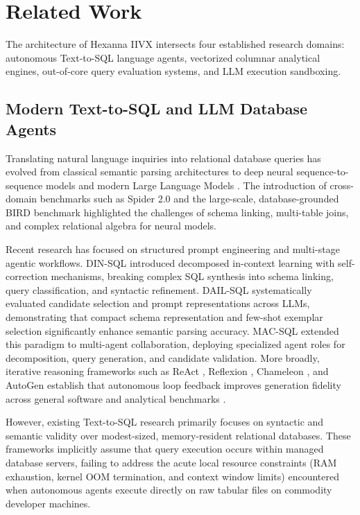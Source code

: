 \section{Related Work}
\label{sec:related_work}

The architecture of Hexanna IIVX intersects four established research domains: autonomous Text-to-SQL language agents, vectorized columnar analytical engines, out-of-core query evaluation systems, and LLM execution sandboxing.

\subsection{Modern Text-to-SQL and LLM Database Agents}
Translating natural language inquiries into relational database queries has evolved from classical semantic parsing architectures \cite{qin2024survey} to deep neural sequence-to-sequence models and modern Large Language Models \cite{zhou2022table,zan2023large,chen2021codex}. The introduction of cross-domain benchmarks such as Spider 2.0 \cite{zhang2024spider2} and the large-scale, database-grounded BIRD benchmark \cite{li2024bird} highlighted the challenges of schema linking, multi-table joins, and complex relational algebra for neural models.

Recent research has focused on structured prompt engineering and multi-stage agentic workflows. DIN-SQL \cite{pourreza2024dinsql} introduced decomposed in-context learning with self-correction mechanisms, breaking complex SQL synthesis into schema linking, query classification, and syntactic refinement. DAIL-SQL \cite{gao2023dailsql} systematically evaluated candidate selection and prompt representations across LLMs, demonstrating that compact schema representation and few-shot exemplar selection significantly enhance semantic parsing accuracy. MAC-SQL \cite{wang2024macsql} extended this paradigm to multi-agent collaboration, deploying specialized agent roles for decomposition, query generation, and candidate validation. More broadly, iterative reasoning frameworks such as ReAct \cite{yao2022react}, Reflexion \cite{shinn2023reflexion}, Chameleon \cite{lu2023chameleon}, and AutoGen \cite{wu2023autogen} establish that autonomous loop feedback improves generation fidelity across general software and analytical benchmarks \cite{liu2023agentbench}.

However, existing Text-to-SQL research primarily focuses on syntactic and semantic validity over modest-sized, memory-resident relational databases. These frameworks implicitly assume that query execution occurs within managed database servers, failing to address the acute local resource constraints (RAM exhaustion, kernel OOM termination, and context window limits) encountered when autonomous agents execute directly on raw tabular files on commodity developer machines.

